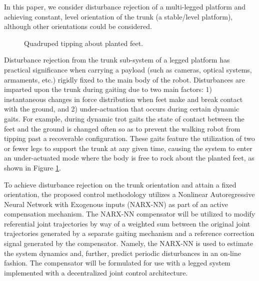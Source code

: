 In this paper, we consider disturbance rejection of a multi-legged platform and achieving constant, level orientation of the trunk (\IE a stable/level platform), although other orientations could be considered. 
	\begin{figure}[t!]
		\vspace{2mm}
		\centering
		\caption{ Quadruped tipping about planted feet.}
		\label{fig::quadruped_walking}
		\vspace{-7mm}
	\end{figure}
Disturbance rejection from the trunk sub-system of a legged platform has practical significance when carrying a payload (such as cameras, optical systems, armaments, etc.) rigidly fixed to the main body of the robot. Disturbances are imparted upon the trunk during gaiting due to two main factors: 1) instantaneous changes in force distribution when feet make and break contact with the ground, and 2) under-actuation that occurs during certain dynamic gaits. For example, during dynamic trot gaits the state of contact between the feet and the ground is changed often so as to prevent the walking robot from tipping past a recoverable configuration. These gaits feature the utilization of two or fewer legs to support the trunk at any given time, causing the system to enter an under-actuated mode where the body is free to rock about the planted feet, as shown in Figure \ref{fig::quadruped_walking}.

To achieve disturbance rejection on the trunk orientation and attain a fixed orientation, the proposed control methodology utilizes a Nonlinear Autoregressive Neural Network with Exogenous inputs (NARX-NN) as part of an active compensation mechanism. The NARX-NN compensator will be utilized to modify referential joint trajectories by way of a weighted sum between the original joint trajectories generated by a separate gaiting mechanism and a reference correction signal generated by the compensator. Namely, the NARX-NN is used to estimate the system dynamics and, further, predict periodic disturbances in an on-line fashion. The compensator will be formulated for use with a legged system implemented with a decentralized joint control architecture. 

